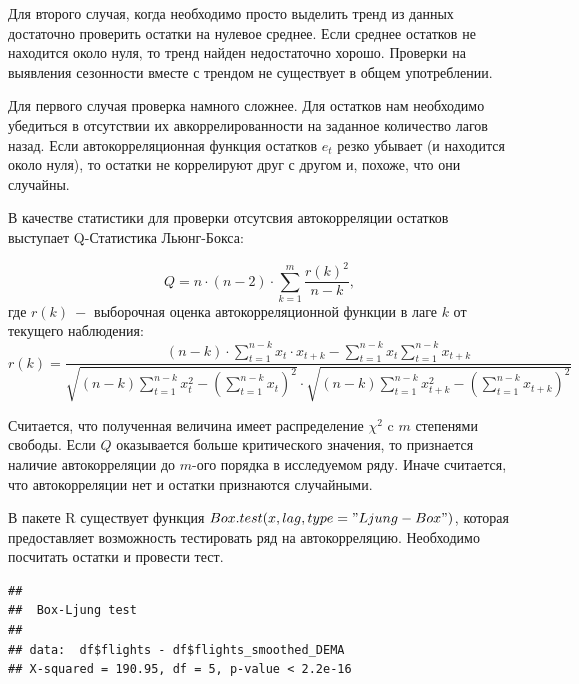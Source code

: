 \documentclass[
]{article}
\newenvironment{Shaded}{}{}
\newcommand{\AttributeTok}[1]{#1}
\newcommand{\DecValTok}[1]{#1}
\newcommand{\FunctionTok}[1]{#1}
\newcommand{\NormalTok}[1]{#1}
\newcommand{\SpecialCharTok}[1]{\textcolor[rgb]{0.00,0.50,0.50}{#1}}
\newcommand{\StringTok}[1]{\textcolor[rgb]{0.00,0.50,0.50}{#1}}
\begin{document}
Для второго случая, когда необходимо просто выделить тренд из данных
достаточно проверить остатки на нулевое среднее. Если среднее остатков
не находится около нуля, то тренд найден недостаточно хорошо. Проверки
на выявления сезонности вместе с трендом не существует в общем
употреблении.

Для первого случая проверка намного сложнее. Для остатков нам необходимо
убедиться в отсутствии их авкоррелированности на заданное количество
лагов назад. Если автокорреляционная функция остатков \(e_t\) резко
убывает (и находится около нуля), то остатки не коррелируют друг с
другом и, похоже, что они случайны.

В качестве статистики для проверки отсутсвия автокорреляции остатков
выступает Q-Статистика Льюнг-Бокса:

\[
Q = n \cdot (n - 2) \cdot \sum \limits_{k=1}^{m}\frac{r(k)^2}{n-k},
\] где \(r(k)\ -\) выборочная оценка автокорреляционной функции в лаге
\(k\) от текущего наблюдения: \[
r(k) = \frac{(n-k)\cdot \sum\limits_{t=1}^{n-k}x_t \cdot x_{t+k} - \sum\limits_{t=1}^{n-k} x_t \sum\limits_{t=1}^{n-k} x_{t+k}}{\sqrt{(n-k)\sum\limits_{t=1}^{n-k}x_t^2 - (\sum\limits_{t=1}^{n-k}x_t)^2} \cdot \sqrt{(n-k)\sum\limits_{t=1}^{n-k}x_{t + k}^2 - (\sum\limits_{t=1}^{n-k}x_{t+k})^2}}
\]

Считается, что полученная величина имеет распределение \(\chi^2\) c
\(m\) степенями свободы. Если \(Q\) оказывается больше критического
значения, то признается наличие автокорреляции до \(m\)-ого порядка в
исследуемом ряду. Иначе считается, что автокорреляции нет и остатки
признаются случайными.

В пакете R существует функция \(Box.test(x, lag, type="Ljung-Box")\),
которая предоставляет возможность тестировать ряд на автокорреляцию.
Необходимо посчитать остатки и провести тест.

\begin{Shaded}
\end{Shaded}

\begin{verbatim}
## 
##  Box-Ljung test
## 
## data:  df$flights - df$flights_smoothed_DEMA
## X-squared = 190.95, df = 5, p-value < 2.2e-16
\end{verbatim}
\end{document}
